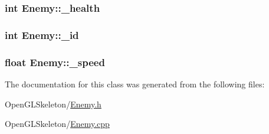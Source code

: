 \subsubsection[{\texorpdfstring{\+\_\+health}{_health}}]{\setlength{\rightskip}{0pt plus 5cm}int Enemy\+::\+\_\+health}\hypertarget{class_enemy_a410845277e89ce6c73b2df15d0621cf7}{}\label{class_enemy_a410845277e89ce6c73b2df15d0621cf7}
\subsubsection[{\texorpdfstring{\+\_\+id}{_id}}]{\setlength{\rightskip}{0pt plus 5cm}int Enemy\+::\+\_\+id}\hypertarget{class_enemy_abb5f5667c06218536bf516b249d2d4cb}{}\label{class_enemy_abb5f5667c06218536bf516b249d2d4cb}
\subsubsection[{\texorpdfstring{\+\_\+speed}{_speed}}]{\setlength{\rightskip}{0pt plus 5cm}float Enemy\+::\+\_\+speed}\hypertarget{class_enemy_a5ad8a827b28dd24331a434d1993d5c01}{}\label{class_enemy_a5ad8a827b28dd24331a434d1993d5c01}


The documentation for this class was generated from the following files\+:\begin{DoxyCompactItemize}
\item 
Open\+G\+L\+Skeleton/\hyperlink{_enemy_8h}{Enemy.\+h}\item 
Open\+G\+L\+Skeleton/\hyperlink{_enemy_8cpp}{Enemy.\+cpp}\end{DoxyCompactItemize}
